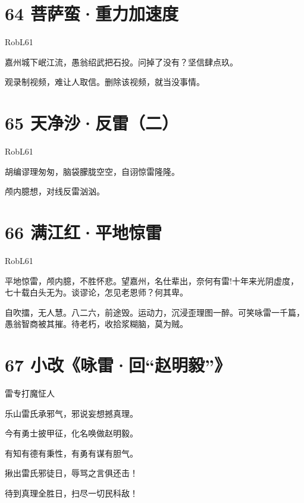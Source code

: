 \documentclass[UTF8,12pt,oneside]{ctexbook}
\begin{document}
        \newpage
        
        \section{64 菩萨蛮·重力加速度}
        \begin{center}
            RobL61
        \end{center}
        
        嘉州城下岷江流，愚翁绍武把石投。问掉了没有？坚信肆点玖。
        
        观录制视频，难让人取信。删除该视频，就当没事情。
        
        \section{65 天净沙·反雷（二）}
        \begin{center}
            RobL61
        \end{center}
        
        \begin{center}
        胡编谬理匆匆，脑袋朦胧空空，自诩惊雷隆隆。
        
        颅内臆想，对线反雷汹汹。
        \end{center}
        
        \section{66 满江红·平地惊雷}
        \begin{center}
            RobL61
        \end{center}
        
        平地惊雷，颅内臆，不胜怀悲。望嘉州，名仕辈出，奈何有雷!十年来光阴虚度，七十载白头无为。谈谬论，怎见老恩师？何其卑。
        
        自吹擂，无人慧。八二六，前途毁。运动力，沉浸歪理图一醉。可笑咏雷一千篇，愚翁智商被其摧。待老朽，收拾浆糊脑，莫为贼。
        
        \newpage
        
        \section{67 小改《咏雷·回“赵明毅”》}
        \begin{center}
            雷专打魔怔人
        \end{center}
        
        \begin{center}
            乐山雷氏承邪气，邪说妄想撼真理。
            
            今有勇士披甲征，化名唤做赵明毅。
            
            有知有德有秉性，有勇有谋有胆气。
            
            揪出雷氏邪徒日，辱骂之言俱还击！
            
            待到真理全胜日，扫尽一切民科敌！
        \end{center}
        ~\\
        
\end{document}
